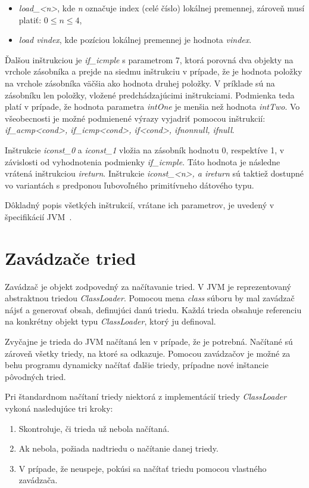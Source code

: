 \documentclass[11pt,final,oneside]{fithesis}
\begin{document}
\begin{itemize}
\item \textit{load\_<n>}, kde \textit{n} označuje index (celé číslo) lokálnej 
premennej, zároveň musí platiť: $0 \leq n \leq 4$,
\item \textit{load vindex}, kde pozíciou lokálnej premennej je hodnota
\textit{vindex}.
\end{itemize}

Ďalšou inštrukciou je \textit{if\_icmple} s parametrom 7, ktorá porovná dva 
objekty na vrchole zásobníka a prejde na siedmu inštrukciu v prípade, že je 
hodnota položky na vrchole zásobníka väčšia ako hodnota druhej položky. V 
príklade sú na zásobníku len položky, vložené predchádzajúcimi inštrukciami.
Podmienka teda platí v prípade, že hodnota parametra \textit{intOne} je menšia
než hodnota \textit{intTwo}. Vo všeobecnosti je možné podmienené výrazy 
vyjadriť pomocou inštrukcií: \textit{if\_acmp<cond>, if\_icmp<cond>, if<cond>,
ifnonnull, ifnull}.

Inštrukcie \textit{iconst\_0} a \textit{iconst\_1} vložia na zásobník hodnotu 
0, respektíve 1, v závislosti od vyhodnotenia podmienky \textit{if\_icmple}. 
Táto hodnota je následne vrátená inštrukciou \textit{ireturn}. Inštrukcie
\textit{iconst\_<n>, a ireturn} sú taktiež dostupné vo variantách s predponou 
ľubovoľného primitívneho dátového typu.

Dôkladný popis všetkých inštrukcií, vrátane ich parametrov, je uvedený v 
špecifikácií JVM~\cite{Lindholm:2013:JVM:2462629}.

\chapter{Zavádzače tried} 

Zavádzač je objekt zodpovedný za načítavanie tried. V JVM je reprezentovaný 
abstraktnou triedou \textit{ClassLoader}. Pomocou mena \textit{class} súboru by
mal zavádzač nájsť a generovať obsah, definujúci danú triedu. Každá
trieda obsahuje referenciu na konkrétny objekt typu \textit{ClassLoader}, 
ktorý ju definoval.~\cite{Oracle:ClassLoader}

Zvyčajne je trieda do JVM načítaná len v prípade, že je potrebná. Načítané sú 
zároveň všetky triedy, na ktoré sa odkazuje. Pomocou zavádzačov je
možné za behu programu dynamicky načítať ďalšie triedy, prípadne nové 
inštancie pôvodných tried.

Pri štandardnom načítaní triedy niektorá z implementácií triedy 
\textit{ClassLoader} vykoná nasledujúce tri kroky:
\begin{enumerate}
\item Skontroluje, či trieda už nebola načítaná.
\item Ak nebola, požiada nadtriedu o načítanie danej triedy. 
\item V prípade, že neuspeje, pokúsi sa načítať triedu pomocou
vlastného zavádzača.
\end{enumerate}
\end{document}
